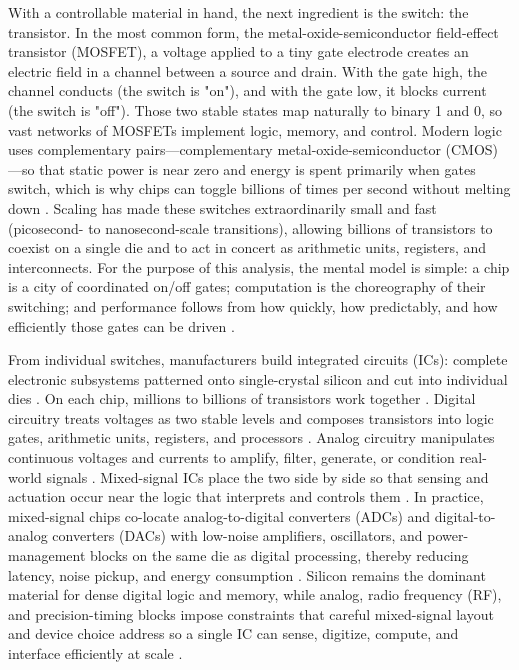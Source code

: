 With a controllable material in hand, the next ingredient is the switch: the transistor. In the most common form, the metal-oxide-semiconductor field-effect transistor (MOSFET), a voltage applied to a tiny gate electrode creates an electric field in a channel between a source and drain. With the gate high, the channel conducts (the switch is "on"), and with the gate low, it blocks current (the switch is "off"). Those two stable states map naturally to binary 1 and 0, so vast networks of MOSFETs implement logic, memory, and control. Modern logic uses complementary pairs---complementary metal-oxide-semiconductor (CMOS)---so that static power is near zero and energy is spent primarily when gates switch, which is why chips can toggle billions of times per second without melting down \parencite{razavi_design_2001}. Scaling has made these switches extraordinarily small and fast (picosecond- to nanosecond-scale transitions), allowing billions of transistors to coexist on a single die and to act in concert as arithmetic units, registers, and interconnects. For the purpose of this analysis, the mental model is simple: a chip is a city of coordinated on/off gates; computation is the choreography of their switching; and performance follows from how quickly, how predictably, and how efficiently those gates can be driven \parencite{taur_fundamentals_2009,weste_cmos_2011,rabaey_digital_2003}.

From individual switches, manufacturers build integrated circuits (ICs): complete electronic subsystems patterned onto single-crystal silicon and cut into individual dies \parencite{sze_physics_2007}. On each chip, millions to billions of transistors work together \parencite{weste_cmos_2011}. Digital circuitry treats voltages as two stable levels and composes transistors into logic gates, arithmetic units, registers, and processors \parencite{rabaey_digital_2003}. Analog circuitry manipulates continuous voltages and currents to amplify, filter, generate, or condition real-world signals \parencite{smith_microelectronic_2015, razavi_fundamentals_2008, rabaey_digital_2003}. Mixed-signal ICs place the two side by side so that sensing and actuation occur near the logic that interprets and controls them \parencite{pelgrom_analog--digital_2017}. In practice, mixed-signal chips co-locate analog-to-digital converters (ADCs) and digital-to-analog converters (DACs) with low-noise amplifiers, oscillators, and power-management blocks on the same die as digital processing, thereby reducing latency, noise pickup, and energy consumption \parencite{kester_data_2005}. Silicon remains the dominant material for dense digital logic and memory, while analog, radio frequency (RF), and precision-timing blocks impose constraints that careful mixed-signal layout and device choice address so a single IC can sense, digitize, compute, and interface efficiently at scale \parencite{lee_design_2004,razavi_fundamentals_2008}.

